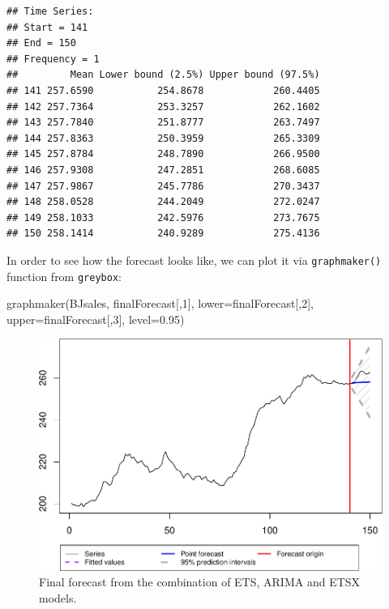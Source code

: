 \documentclass[
]{book}
\newenvironment{Shaded}{\begin{snugshade}}{\end{snugshade}}
\newcommand{\AttributeTok}[1]{\textcolor[rgb]{0.77,0.63,0.00}{#1}}
\newcommand{\DecValTok}[1]{\textcolor[rgb]{0.00,0.00,0.81}{#1}}
\newcommand{\FloatTok}[1]{\textcolor[rgb]{0.00,0.00,0.81}{#1}}
\newcommand{\FunctionTok}[1]{\textcolor[rgb]{0.00,0.00,0.00}{#1}}
\newcommand{\NormalTok}[1]{#1}
\theoremstyle{definition}
\theoremstyle{definition}
\theoremstyle{definition}
\theoremstyle{definition}
\theoremstyle{remark}
\begin{document}
\begin{verbatim}
## Time Series:
## Start = 141 
## End = 150 
## Frequency = 1 
##         Mean Lower bound (2.5%) Upper bound (97.5%)
## 141 257.6590           254.8678            260.4405
## 142 257.7364           253.3257            262.1602
## 143 257.7840           251.8777            263.7497
## 144 257.8363           250.3959            265.3309
## 145 257.8784           248.7890            266.9500
## 146 257.9308           247.2851            268.6085
## 147 257.9867           245.7786            270.3437
## 148 258.0528           244.2049            272.0247
## 149 258.1033           242.5976            273.7675
## 150 258.1414           240.9289            275.4136
\end{verbatim}

In order to see how the forecast looks like, we can plot it via \texttt{graphmaker()} function from \texttt{greybox}:

\begin{Shaded}
\begin{Highlighting}[]
\FunctionTok{graphmaker}\NormalTok{(BJsales, finalForecast[,}\DecValTok{1}\NormalTok{],}
           \AttributeTok{lower=}\NormalTok{finalForecast[,}\DecValTok{2}\NormalTok{], }\AttributeTok{upper=}\NormalTok{finalForecast[,}\DecValTok{3}\NormalTok{],}
           \AttributeTok{level=}\FloatTok{0.95}\NormalTok{)}
\end{Highlighting}
\end{Shaded}

\begin{figure}
\centering
\includegraphics{Svetunkov--2022----ADAM_files/figure-latex/adamCombinedfinalForecast-1.pdf}
\caption{\label{fig:adamCombinedfinalForecast}Final forecast from the combination of ETS, ARIMA and ETSX models.}
\end{figure}
\end{document}
